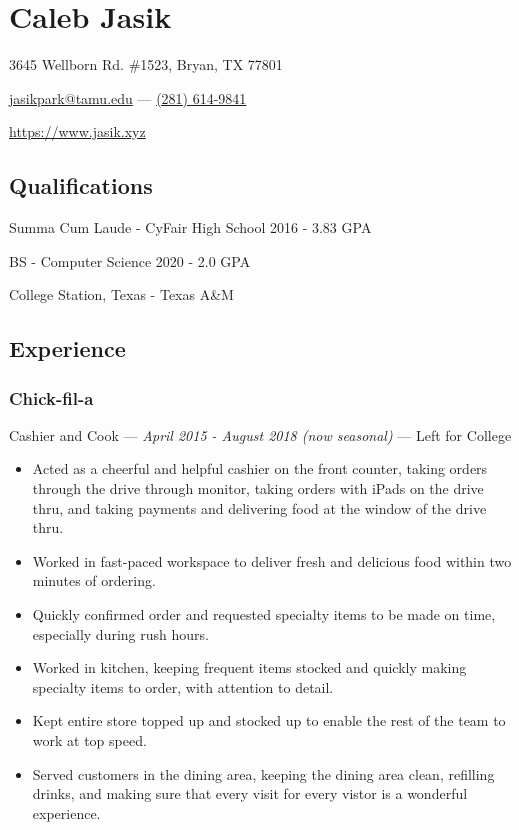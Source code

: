 \documentclass[letterpaper,10pt]{article}
\begin{document}
\section{\Huge Caleb Jasik}

\hfill 3645 Wellborn Rd. \#1523, Bryan, TX 77801

\hfill \href{mailto:jasikpark@tamu.edu}{jasikpark@tamu.edu} ---
\href{tel:2816149841}{(281) 614-9841}

\hfill \href{https://jasik.xyz}{https://www.jasik.xyz}

\subsection{Qualifications}

Summa Cum Laude - CyFair High School 2016 - 3.83 GPA

BS - Computer Science 2020 - 2.0 GPA

College Station, Texas - Texas A\&M



\subsection{Experience}

\subsubsection{Chick-fil-a}
\hfill Cashier and Cook --- \emph{April 2015 - August 2018 (now seasonal)} --- Left for College

\begin{itemize}
\tightlist{}
\item
	Acted as a cheerful and helpful cashier on the front counter, taking orders through the drive through monitor, taking orders with iPads on the drive thru, and taking payments and delivering food at the window of the drive thru.
\item
	Worked in fast-paced workspace to deliver fresh and delicious food within two minutes of ordering.
\item
	Quickly confirmed order and requested specialty items to be made on time, especially during rush hours.
\item
	Worked in kitchen, keeping frequent items stocked and quickly making specialty items to order, with attention to detail.
\item
	Kept entire store topped up and stocked up to enable the rest of the team to work at top speed.
\item
	Served customers in the dining area, keeping the dining area clean, refilling drinks, and making sure that every visit for every vistor is a wonderful experience.\end{itemize}
\end{document}
